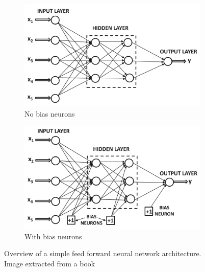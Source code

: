 \begin{figure}[t]

\begin{subfigure}[t]{.5\textwidth}
  \centering
  \includegraphics[width=\linewidth]{Figures/fig_ffnn_no_bias.png}
  \caption{No bias neurons}
  \label{fig:ffnn_wo_bias}
\end{subfigure}%
\hspace{0.5cm}
\begin{subfigure}[t]{.5\textwidth}
  \includegraphics[width=\linewidth]{Figures/fig_ffnn_bias.png}
  \caption{With bias neurons}
  \label{fig:ffnn_w_bias}
\end{subfigure}
 \caption{Overview of a simple feed forward neural network architecture. Image extracted from a book~\protect\cite{DBLP:books/sp/Aggarwal18}} 
  \label{fig:whole_ffnn}
\end{figure}